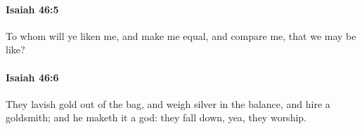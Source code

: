 		\paragraph{Isaiah 46:5} %
			\label{ISAIAH-46-5}

			To whom will ye liken me, and make me equal, and compare me, that we may be like?


		\paragraph{Isaiah 46:6} %
			\label{ISAIAH-46-6}

			They lavish gold out of the bag, and weigh silver in the balance, and hire a goldsmith; and he maketh it a god: they fall down, yea, they worship.


